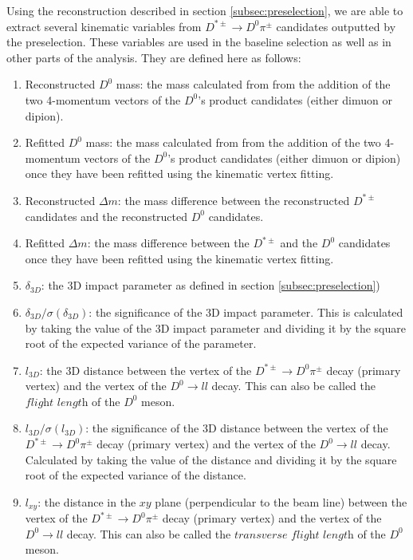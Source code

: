 Using the reconstruction described in section \ref{subsec:preselection}, we are able to extract several kinematic variables from $D^{*\pm} \to D^0 \pi^\pm$ candidates outputted by the preselection. These variables are used in the baseline selection as well as in other parts of the analysis. They are defined here as follows:
\begin{enumerate}
    \item Reconstructed $D^0$ mass: the mass calculated from from the addition of the two 4-momentum vectors of the $D^0$'s product candidates (either dimuon or dipion). 
    \item Refitted $D^0$ mass: the mass calculated from from the addition of the two 4-momentum vectors of the $D^0$'s product candidates (either dimuon or dipion) once they have been refitted using the kinematic vertex fitting. 
    \item Reconstructed $\Delta m$: the mass difference between the reconstructed $D^{*\pm}$ candidates and the reconstructed $D^0$ candidates. 
    \item Refitted $\Delta m$: the mass difference between the $D^{*\pm}$ and the $D^0$ candidates once they have been refitted using the kinematic vertex fitting.
    \item $\delta_{3D}$: the 3D impact parameter as defined in section \ref{subsec:preselection})
    \item $\delta_{3D}/\sigma\left(\delta_{3D}\right)$: the significance of the 3D impact parameter. This is calculated by taking the value of the 3D impact parameter and dividing it by the square root of the expected variance of the parameter. 
    \item $l_{3D}$: the 3D distance between the vertex of the $D^{*\pm} \to D^0 \pi^\pm$ decay (primary vertex) and the vertex of the $D^0 \to l l$ decay. This can also be called the $\textit{flight length}$ of the $D^0$ meson. 
    \item $l_{3D}/\sigma\left(l_{3D}\right)$: the significance of the 3D distance between the vertex of the $D^{*\pm} \to D^0 \pi^\pm$ decay (primary vertex) and the vertex of the $D^0 \to l l$ decay. Calculated by taking the value of the distance and dividing it by the square root of the expected variance of the distance. 
    \item $l_{xy}$: the distance in the $xy$ plane (perpendicular to the beam line) between the vertex of the $D^{*\pm} \to D^0 \pi^\pm$ decay (primary vertex) and the vertex of the $D^0 \to l l$ decay.  This can also be called the $\textit{transverse flight length}$ of the $D^0$ meson. 

\end{enumerate}
